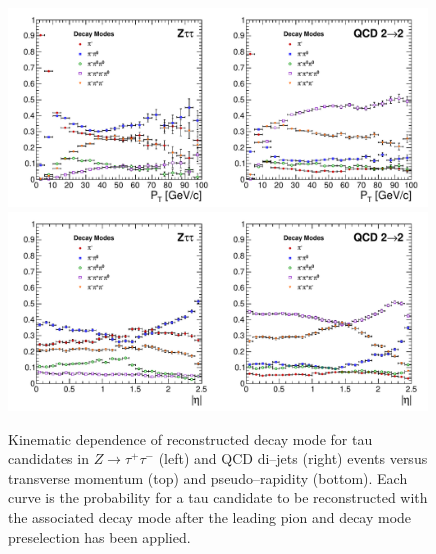 \begin{figure}[thbp]
   \setlength{\unitlength}{1mm}
   \begin{center}
     \includegraphics*[width=0.99\textwidth]{tanc_chapter/figures/dmVsPt.pdf}
     \includegraphics*[width=0.99\textwidth]{tanc_chapter/figures/dmVsEta.pdf}
   \caption[Kinematic dependence of decay mode reconstruction]{Kinematic
   dependence of reconstructed decay mode for tau candidates in 
   \mbox{$Z\to\tau^{+}\tau^{-}$} (left) and QCD di--jets (right) events versus
   transverse momentum (top) and pseudo--rapidity (bottom).  Each curve is the
   probability for a tau candidate to be reconstructed with the associated
   decay mode after the leading pion and decay mode preselection has been
   applied.  } \label{fig:dmKinematics}
   \end{center}
\end{figure}
